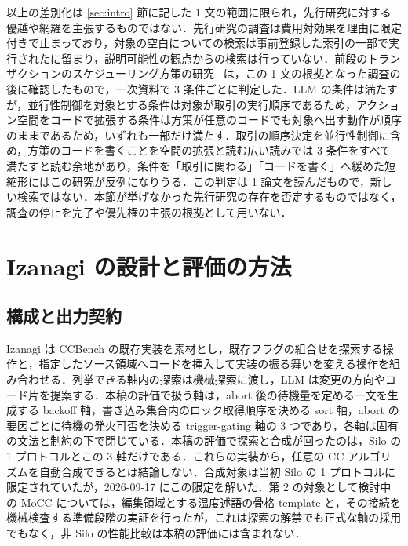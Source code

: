 \documentclass[submit,techrep,noauthor]{ipsj}
\begin{document}
以上の差別化は \ref{sec:intro} 節に記した 1 文の範囲に限られ，先行研究に対する優越や網羅を主張するものではない．先行研究の調査は費用対効果を理由に限定付きで止まっており，対象の空白についての検索は事前登録した索引の一部で実行されたに留まり，説明可能性の観点からの検索は行っていない．前段のトランザクションのスケジューリング方策の研究~\cite{adrs} は，この 1 文の根拠となった調査の後に確認したもので，一次資料で 3 条件ごとに判定した．LLM の条件は満たすが，並行性制御を対象とする条件は対象が取引の実行順序であるため，アクション空間をコードで拡張する条件は方策が任意のコードでも対象へ出す動作が順序のままであるため，いずれも一部だけ満たす．取引の順序決定を並行性制御に含め，方策のコードを書くことを空間の拡張と読む広い読みでは 3 条件をすべて満たすと読む余地があり，条件を「取引に関わる」「コードを書く」へ緩めた短縮形にはこの研究が反例になりうる．この判定は 1 論文を読んだもので，新しい検索ではない．本節が挙げなかった先行研究の存在を否定するものではなく，調査の停止を完了や優先権の主張の根拠として用いない．

\section{Izanagi の設計と評価の方法}
\label{sec:design}

\subsection{構成と出力契約}
\label{sec:design-overview}

Izanagi は CCBench の既存実装を素材とし，既存フラグの組合せを探索する操作と，指定したソース領域へコードを挿入して実装の振る舞いを変える操作を組み合わせる．列挙できる軸内の探索は機械探索に渡し，LLM は変更の方向やコード片を提案する．本稿の評価で扱う軸は，abort 後の待機量を定める一文を生成する backoff 軸，書き込み集合内のロック取得順序を決める sort 軸，abort の要因ごとに待機の発火可否を決める trigger-gating 軸の 3 つであり，各軸は固有の文法と制約の下で閉じている．本稿の評価で探索と合成が回ったのは，Silo の 1 プロトコルとこの 3 軸だけである．これらの実装から，任意の CC アルゴリズムを自動合成できるとは結論しない．合成対象は当初 Silo の 1 プロトコルに限定されていたが，2026-09-17 にこの限定を解いた．第 2 の対象として検討中の MoCC については，編集領域とする温度述語の骨格 template と，その接続を機械検査する準備段階の実証を行ったが，これは探索の解禁でも正式な軸の採用でもなく，非 Silo の性能比較は本稿の評価には含まれない．
\end{document}

